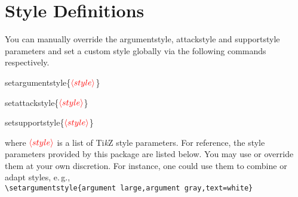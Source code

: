 \documentclass[headings=normal]{scrartcl}
\newcommand{\tikzname}{Ti\emph{k}Z\xspace}
\newcommand{\opt}[2][red]{\ensuremath{\textcolor{#1}{\langle #2\rangle}}}
\newcommand{\makecmd}[1]{\textbackslash\hspace{-1ex}#1}
\newenvironment{command*}[1]{
    \medskip\medskip
    \hspace{-1.5cm}{\ttfamily \makecmd{#1}}
    \medskip
    
}{}
\begin{document}
\appendix
\newpage
\section{Style Definitions}\label{sec:style-definitions}
    You can manually override the \textsf{argumentstyle}, \textsf{attackstyle} and \textsf{supportstyle} parameters and set a custom style globally via the following commands respectively.\\

    \begin{command*}{setargumentstyle\{\opt{style}\}}
    \end{command*}
    \begin{command*}{setattackstyle\{\opt{style}\}}
    \end{command*}
    \begin{command*}{setsupportstyle\{\opt{style}\}}
    \end{command*}
    
    where \opt{style} is a list of \tikzname style parameters.
    For reference, the style parameters provided by this package are listed below.
    You may use or override them at your own discretion.
    For instance, one could use them to combine or adapt styles, e.\,g.,\\

    \noindent
    \verb|\setargumentstyle{argument large,argument gray,text=white}|
\end{document}
